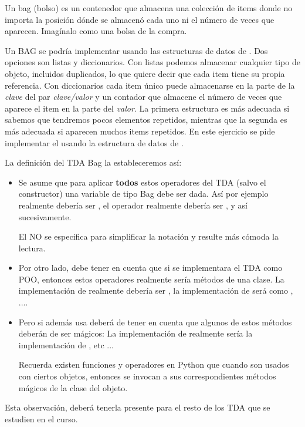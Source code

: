 Un bag (bolso) es un contenedor que almacena una colección de items donde no importa la posición dónde se almacenó cada uno ni el número de veces que aparecen. Imagínalo como una bolsa de la compra.

Un BAG se podría implementar usando las estructuras de datos de .
Dos opciones son listas y diccionarios. Con listas podemos almacenar cualquier tipo de objeto, incluidos duplicados, lo que quiere decir que cada item tiene su propia referencia. Con diccionarios cada item único puede almacenarse en la parte de la \textit{clave} del par \textit{clave/valor} y un contador que almacene el número de veces que aparece el item en la parte del \textit{valor}. La primera estructura es más adecuada si sabemos que tendremos pocos elementos repetidos, mientras que la segunda es más adecuada si aparecen muchos items repetidos. En este ejercicio se pide implementar el  usando la estructura de datos  de .

La definición del TDA Bag la estableceremos así:







\begin{note}
\begin{itemize}
\item 
Se asume que para aplicar \textbf{todos} estos operadores del TDA (salvo el constructor) una variable  de tipo Bag debe ser dada. Así por ejemplo  realmente debería ser ,  el operador  realmente debería ser  , y así sucesivamente. 

El  NO se especifica para  simplificar la notación y resulte más cómoda la lectura. 

\item Por otro lado, debe tener en cuenta que si se implementara el TDA como POO, entonces estos operadores realmente sería métodos de una clase. La implementación de
 realmente debería ser ,  la implementación de   será como , .... 

\item Pero si además usa  deberá de tener en cuenta que algunos de estos métodos deberán de ser mágicos: La implementación de  realmente sería la implementación de , etc ...  

Recuerda existen funciones y operadores en Python que cuando son usados con ciertos objetos, entonces se invocan a sus correspondientes métodos mágicos de la clase del objeto.
\end{itemize}

Esta observación, deberá tenerla presente para el resto de los TDA que se estudien en el curso.
\end{note}

